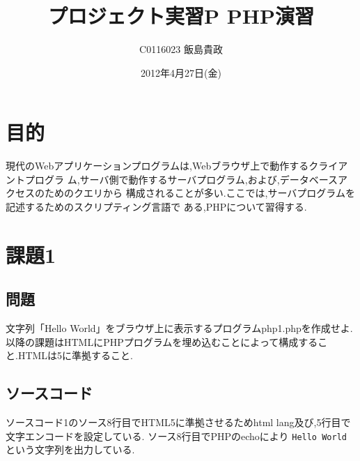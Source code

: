 \documentclass[a4j,10pt]{jsarticle}
\title{プロジェクト実習P PHP演習}
\author{C0116023 飯島貴政}
\date{2012年4月27日(金)}
\begin{document}
\maketitle


\section{目的}

現代のWebアプリケーションプログラムは,Webブラウザ上で動作するクライアントプログラ
ム,サーバ側で動作するサーバプログラム,および,データベースアクセスのためのクエリから
構成されることが多い.ここでは,サーバプログラムを記述するためのスクリプティング言語で
ある,PHPについて習得する.

\lstset{
    language = PHP,
    breaklines = true,
    breakindent = 10pt,
    basicstyle = \ttfamily\scriptsize,
    classoffset = 0,
    frame = TBrl,
    framesep = 5pt,
    numbers = left,
    stepnumber = 1,
    numberstyle = \tiny,
    tabsize = 4,
    captionpos = t
}

\section{課題1}

\subsection{問題}

文字列「Hello World」をブラウザ上に表示するプログラムphp1.phpを作成せよ.
以降の課題はHTMLにPHPプログラムを埋め込むことによって構成すること.HTMLは5に準拠すること.


\subsection{ソースコード}
ソースコード1のソース8行目でHTML5に準拠させるためhtml lang及び,5行目で文字エンコードを設定している.
ソース8行目でPHPのechoにより {\tt Hello World }という文字列を出力している.


\newpage
\end{document}

